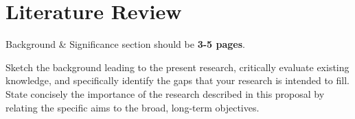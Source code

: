 
\section{Literature Review}
Background \& Significance section should be \textbf{3-5 pages}.

Sketch the background leading to the present research, critically evaluate existing knowledge, and
specifically identify the gaps that your research is intended to fill. State concisely the importance of the
research described in this proposal by relating the specific aims to the broad, long-term objectives.

